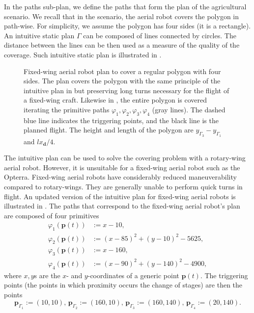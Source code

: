 In the paths sub-plan, we define the paths that form the plan of the agricultural scenario. We recall that in the scenario, the aerial robot covers the polygon in  path-wise. For simplicity, we assume the polygon has four sides (it is a rectangle). An intuitive static plan $\Gamma$ can be composed of lines connected by circles. The distance between the lines can be then used as a measure of the quality of the coverage. Such intuitive static plan is illustrated in .

\begin{figure}[p!]
  \centering
  
  \caption[Fixed-wing aerial robot's plan to cover a regular polygon with four sides]{Fixed-wing aerial robot plan to cover a regular polygon with four sides. The plan covers the polygon with the same principle of the intuitive plan in  but preserving long turns necessary for the flight of a fixed-wing craft. Likewise in , the entire polygon is covered iterating the primitive paths $\varphi_1,\varphi_2,\varphi_3,\varphi_4$ (gray lines). The dashed blue line indicates the triggering points, and the black line is the planned flight. The height and length of the polygon are $y_{\Gamma_3}-y_{\Gamma_1}$ and $lx_\mathbf{d}/4$.}
  \label{fig:plot4}
\end{figure}


The intuitive plan can be used to solve the covering problem with a rotary-wing aerial robot. However, it is unsuitable for a fixed-wing aerial robot such as the Opterra. Fixed-wing aerial robots have considerably reduced maneuverability compared to rotary-wings. They are generally unable to perform quick turns in flight. An updated version of the intuitive plan for fixed-wing aerial robots is illustrated in . The paths that correspond to the fixed-wing aerial robot's plan are composed of four primitives
\begin{subequations}\label{eq:basic-plan}\begin{align}
\varphi_1(\mathbf{p}(t))&:=x-10,\label{eq:line1}\\
\varphi_2(\mathbf{p}(t))&:=(x-85)^2+(y-10)^2-5625,\label{eq:circ1}\\
\varphi_3(\mathbf{p}(t))&:=x-160,\label{eq:line2}\\
\varphi_4(\mathbf{p}(t))&:=(x-90)^2+(y-140)^2-4900,\label{eq:circ2}\end{align}
\end{subequations}
where $x,y$s are the $x$- and $y$-coordinates of a generic point $\mathbf{p}(t)$. The triggering points (the points in which proximity occurs the change of stages) are then the points
\begin{equation}\label{eq:basic-plan-trigs}
  \mathbf{p}_{\Gamma_1}:=(10,10),\,\mathbf{p}_{\Gamma_2}:=(160,10),\,\mathbf{p}_{\Gamma_3}:=(160,140),\,\mathbf{p}_{\Gamma_4}:=(20,140).
\end{equation}

